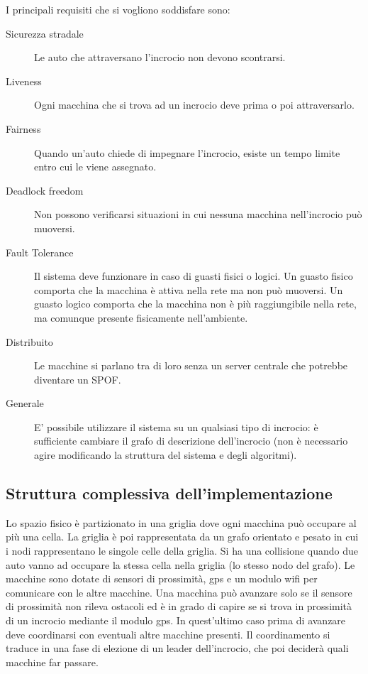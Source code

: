 \documentclass{memoir}
\begin{document}
I principali requisiti che si vogliono soddisfare sono:
\begin{description}
\item[Sicurezza stradale] Le auto che attraversano l'incrocio non devono
  scontrarsi.
\item[Liveness] Ogni macchina che si trova ad un incrocio deve prima o poi
  attraversarlo.
\item[Fairness] Quando un'auto chiede di impegnare l'incrocio, esiste un tempo
  limite entro cui le viene assegnato.
\item[Deadlock freedom] Non possono verificarsi situazioni in cui nessuna
  macchina nell'incrocio può muoversi.
\item [Fault Tolerance] Il sistema deve funzionare in caso di guasti fisici o
  logici. Un guasto fisico comporta che la macchina è attiva nella rete ma non
  può muoversi. Un guasto logico comporta che la macchina non è più
  raggiungibile nella rete, ma comunque presente fisicamente nell'ambiente.
\item [Distribuito] Le macchine si parlano tra di loro senza un server centrale
  che potrebbe diventare un SPOF.
\item [Generale] E' possibile utilizzare il sistema su un qualsiasi tipo di
  incrocio: è sufficiente cambiare il grafo di descrizione dell'incrocio (non è
  necessario agire modificando la struttura del sistema e degli algoritmi).
\end{description}

\subsection{Struttura complessiva dell'implementazione}

Lo spazio fisico è partizionato in una griglia dove ogni macchina può occupare
al più una cella. La griglia è poi rappresentata da un grafo orientato e pesato
in cui i nodi rappresentano le singole celle della griglia. Si ha una collisione
quando due auto vanno ad occupare la stessa cella nella griglia (lo stesso nodo
del grafo). Le macchine sono dotate di sensori di prossimità, gps e un modulo
wifi per comunicare con le altre macchine. Una macchina può avanzare solo se il
sensore di prossimità non rileva ostacoli ed è in grado di capire se si trova in
prossimità di un incrocio mediante il modulo gps. In quest'ultimo caso prima di
avanzare deve coordinarsi con eventuali altre macchine presenti. Il
coordinamento si traduce in una fase di elezione di un leader dell'incrocio, che
poi deciderà quali macchine far passare.
\end{document}
